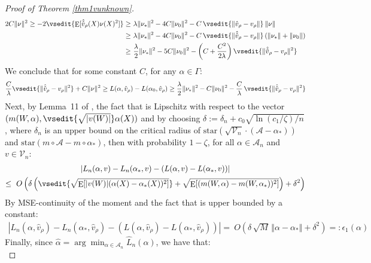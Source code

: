 \documentclass[aos]{imsart}
\numberwithin{equation}{section}
\theoremstyle{plain}
\theoremstyle{remark}
\newcommand{\C}[1]{\mathcal{#1}}
\DeclareMathOperator{\E}{E}
\begin{document}
\begin{appendix}
\begin{proof}[Proof of Theorem \ref{thm1vunknown}]
\begin{align*}
    2C \|\nu\|^2 \geq - 2 \vsedit{\E[\hat{\hat{v}}_\rho(X) \nu(X)^2]} \geq~& \lambda \|\nu_*\|^2 - 4 C\|\nu_0\|^2 - C\, \vsedit{\|\hat{v}_{\rho} - v_{\rho}\|}\, \|\nu\|\\
    \geq~& \lambda \|\nu_*\|^2 - 4 C\|\nu_0\|^2 - C\, \vsedit{\|\hat{\hat{v}}_{\rho} - v_{\rho}\|}\, (\|\nu_*\| + \|\nu_0\|)\\
    \geq~& \frac{\lambda}{2} \|\nu_*\|^2 - 5C\|\nu_0\|^2 - \left(C + \frac{C^2}{2\lambda}\right) \vsedit{\|\hat{\hat{v}}_\rho - v_\rho\|^2} 
\end{align*}
We conclude that for some constant $C$, for any $\alpha\in \Gamma$:
\begin{align}
    \frac{C}{\lambda} \vsedit{\|\hat{\hat{v}}_\rho - v_\rho\|^2}  + C \|\nu\|^2 \geq  L(\alpha, \hat{v}_\rho) - L(\alpha_0, \hat{v}_\rho) \geq \frac{\lambda}{2} \|\nu_{\ast}\|^2 - C \|\nu_0\|^2 -\frac{C}{\lambda}\, \vsedit{\|\hat{\hat{v}}_\rho - v_\rho\|^2}  \label{eqn:quadratic-loss}
\end{align}
%
%
Next, by Lemma~11 of \cite{foster2019orthogonal}, the fact that
 is Lipschitz with
respect to the vector $(m(W,\alpha), \vsedit{\sqrt{|v(W)|}} \alpha(X))$ and by choosing $\delta:=\delta_{n}+c_{0}\sqrt{\ln(c_{1}/\zeta)/n}$, where
$\delta_{n}$ is an upper bound on the critical radius of ${\text{star}%
}(\sqrt{\mathcal{V}_n}\cdot (\mathcal{A}-\alpha_{*}))$ and ${\text{star}}(m\circ\mathcal{A}%
-m\circ\alpha_{*})$, then with probability $1-\zeta$, for all $\alpha\in \C{A}_n$ and $v\in \mathcal{V}_n$:
\begin{multline*}
\left\vert L_{n}(\alpha, v)-L_{n}(\alpha_{*}, v)-(L(\alpha, v)-L(\alpha%
_{*},v))\right\vert \\
\leq~  O\left(  \delta\left(  \vsedit{\sqrt{\E[|v(W)| (\alpha(X) - \alpha_{\ast}(X))^2]}}+\sqrt{\E[(m(W,\mathcal{\alpha
})-m(W,\alpha_{*}))^{2}]}\right)  +\delta^{2}\right)
\end{multline*}
By MSE-continuity of the moment and the fact that  is upper bounded by a constant:
\begin{align*}
\left\vert L_{n}(\alpha, \hat{v}_{\rho})-L_{n}(\alpha_{*}, \hat{v}_{\rho})-(L(\alpha, \hat{v}_{\rho})-L(\alpha%
_{*},\hat{v}_{\rho}))\right\vert=~  O\left(  \delta\,\sqrt{M}\,\Vert\alpha-\alpha_{*}%
\Vert+\delta^{2}\right)  =: \epsilon_{1}(\alpha)
\end{align*}
%
%
Finally, since $\hat{\alpha}=\operatorname{arg}\min_{\alpha%
\in\mathcal{A}_n}\hat{L}_{n}(\alpha)$, we have that:
\begin{equation*}

\end{equation*}
\end{proof}
\end{appendix}
\end{document}
